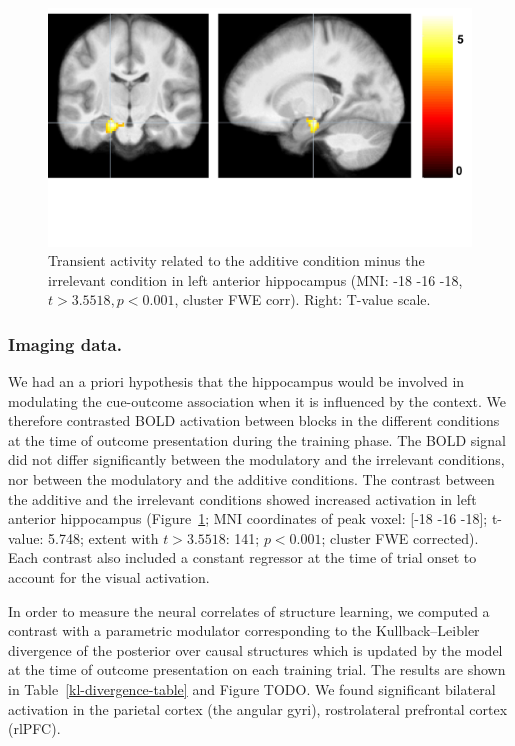 \documentclass[10pt,letterpaper]{article}
\begin{document}
\begin{figure}[ht]
\begin{center}
\includegraphics[scale=0.33,  trim = 0 150 0 0]{additive-irrelevant.pdf}
\end{center}
\caption{Transient activity related to the additive condition minus the irrelevant condition in left anterior hippocampus (MNI: -18 -16 -18, $t > 3.5518, p < 0.001$, cluster FWE corr). Right: T-value scale.} 
\label{additive-irrelevant}
\end{figure}

\subsubsection{Imaging data.} 

We had an a priori hypothesis that the hippocampus would be involved in modulating the cue-outcome association when it is influenced by the context. We therefore contrasted BOLD activation between blocks in the different conditions at the time of outcome presentation during the training phase. The BOLD signal did not differ significantly between the modulatory and the irrelevant conditions, nor between the modulatory and the additive conditions. The contrast between the additive and the irrelevant conditions showed increased activation in left anterior hippocampus (Figure~\ref{additive-irrelevant}; MNI coordinates of peak voxel: [-18 -16 -18]; t-value: 5.748; extent with $t > 3.5518$: 141; $p < 0.001$; cluster FWE corrected). Each contrast also included a constant regressor at the time of trial onset to account for the visual activation.

In order to measure the neural correlates of structure learning, we computed a contrast with a parametric modulator corresponding to the Kullback--Leibler divergence of the posterior over causal structures which is updated by the model at the time of outcome presentation on each training trial. The results are shown in Table~\ref{kl-divergence-table} and Figure TODO. We found significant bilateral activation in the parietal cortex (the angular gyri), rostrolateral prefrontal cortex (rlPFC). 
\end{document}
